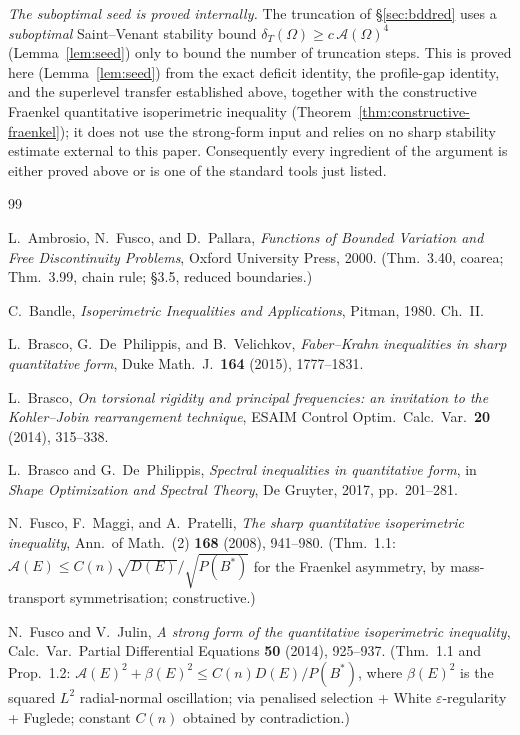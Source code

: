 \documentclass[11pt]{amsart}
\theoremstyle{definition}
\newcommand{\Om}{\Omega}
\newcommand{\Fr}{\mathcal A}
\newcommand{\dT}{\delta_T}
\begin{document}
\emph{The suboptimal seed is proved internally.} The truncation of
\S\ref{sec:bddred} uses a \emph{suboptimal} Saint--Venant stability bound
\(\dT(\Om)\ge c\,\Fr(\Om)^4\) (Lemma~\ref{lem:seed}) only to bound the number
of truncation steps.  This is proved here (Lemma~\ref{lem:seed}) from the
exact deficit identity, the profile-gap identity, and the superlevel transfer
established above, together with the constructive Fraenkel quantitative
isoperimetric inequality (Theorem~\ref{thm:constructive-fraenkel}); it does
not use the strong-form input and relies on no sharp stability estimate external
to this paper.  Consequently
every ingredient of the argument is either proved above or is one of the
standard tools just listed.

\begin{thebibliography}{99}

L.~Ambrosio, N.~Fusco, and D.~Pallara,
\emph{Functions of Bounded Variation and Free Discontinuity Problems},
Oxford University Press, 2000.
(Thm.~3.40, coarea; Thm.~3.99, chain rule; \S3.5, reduced boundaries.)

C.~Bandle,
\emph{Isoperimetric Inequalities and Applications},
Pitman, 1980. Ch.~II.

L.~Brasco, G.~De~Philippis, and B.~Velichkov,
\emph{Faber--Krahn inequalities in sharp quantitative form},
Duke Math.\ J.\ \textbf{164} (2015), 1777--1831.

L.~Brasco,
\emph{On torsional rigidity and principal frequencies: an invitation to the
Kohler--Jobin rearrangement technique},
ESAIM Control Optim.\ Calc.\ Var.\ \textbf{20} (2014), 315--338.

L.~Brasco and G.~De~Philippis,
\emph{Spectral inequalities in quantitative form}, in
\emph{Shape Optimization and Spectral Theory}, De Gruyter, 2017, pp.~201--281.

N.~Fusco, F.~Maggi, and A.~Pratelli,
\emph{The sharp quantitative isoperimetric inequality},
Ann.\ of Math.\ (2) \textbf{168} (2008), 941--980.
(Thm.~1.1: $\mathcal A(E)\le C(n)\sqrt{D(E)}/\sqrt{P(B^*)}$ for the Fraenkel
asymmetry, by mass-transport symmetrisation; constructive.)

N.~Fusco and V.~Julin,
\emph{A strong form of the quantitative isoperimetric inequality},
Calc.\ Var.\ Partial Differential Equations \textbf{50} (2014), 925--937.
(Thm.~1.1 and Prop.~1.2: $\mathcal A(E)^2+\beta(E)^2\le C(n)D(E)/P(B^*)$, where
$\beta(E)^2$ is the squared $L^2$ radial-normal oscillation; via penalised
selection + White $\varepsilon$-regularity + Fuglede; constant $C(n)$ obtained
by contradiction.)


\end{thebibliography}
\end{document}
